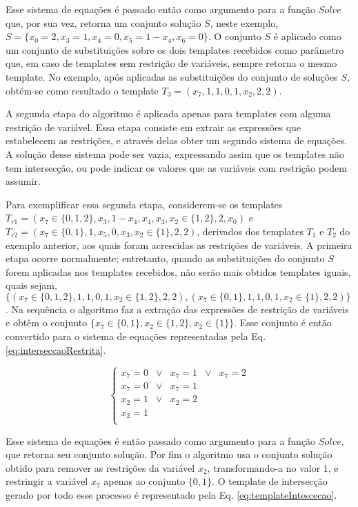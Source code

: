 Esse sistema de equações é passado então como argumento para a função $Solve$ que, por sua vez, retorna um conjunto solução $S$, neste exemplo, $S = \{x_0 = 2, x_3 = 1, x_4 = 0, x_5 = 1 - x_4, x_6 = 0\}$. O conjunto $S$ é aplicado como um conjunto de substituições sobre os dois templates recebidos como parâmetro que, em caso de templates sem restrição de variáveis, sempre retorna o mesmo template. No exemplo, após aplicadas as substituições do conjunto de soluções $S$, obtém-se como resultado o template $T_3 = (x_7, 1, 1, 0, 1, x_2, 2, 2)$.

A segunda etapa do algoritmo é aplicada apenas para templates com alguma restrição de variável. Essa etapa consiste em extrair as expressões que estabelecem as restrições, e através delas obter um segundo sistema de equações. A solução desse sistema pode ser vazia, expressando assim que os templates não tem intersecção, ou pode indicar os valores que as variáveis com restrição podem assumir.

Para exemplificar essa segunda etapa, considerem-se os templates $T_{r1} = (x_7 \in \{0,1,2\},x_3,1-x_4,x_4,x_3,x_2 \in \{1,2\},2,x_0)$ e $T_{r2} = (x_7 \in \{0,1\},1,x_5,0,x_3,x_2 \in \{1\},2,2)$, derivados dos templates $T_1$ e $T_2$ do exemplo anterior, aos quais foram acrescidas as restrições de variáveis. A primeira etapa ocorre normalmente; entretanto, quando as substituições do conjunto $S$ forem aplicadas nos templates recebidos, não serão mais obtidos templates iguais, quais sejam, $\{(x_7 \in \{0,1,2\}, 1, 1, 0, 1, x_2 \in \{1,2\}, 2, 2), (x_7 \in \{0,1\}, 1, 1, 0, 1, x_2 \in \{1\}, 2, 2)\}$. Na sequência o algoritmo faz a extração das expressões de restrição de variáveis e obtêm o conjunto $\{x_7 \in \{0,1\}, x_2 \in \{1,2\}, x_2 \in \{1\} \}$. Esse conjunto é então convertido para o sistema de equações representadas pela Eq. \eqref{eq:interseccaoRestrita}.

\begin{equation}
\left\{\begin{matrix}
x_7	  = 0 	& \vee &	x_7	=	1 & \vee &	x_7	= 2	\\ 
x_7   = 0 	& \vee &	x_7	=	1					\\ 
x_2   = 1 	& \vee &	x_2	=	2					\\ 
x_2	  =	1											\\ 
\end{matrix}\right.
\label{eq:interseccaoRestrita}
\end{equation}

Esse sistema de equações é então passado como argumento para a função $Solve$, que retorna seu conjunto solução. Por fim o algoritmo usa o conjunto solução obtido para remover as restrições da variável $x_2$, transformando-a no valor $1$, e restringir a variável $x_7$ apenas ao conjunto $\{0,1\}$. O template de intersecção gerado por todo esse processo é representado pela Eq. \eqref{eq:templateIntescecao}.

